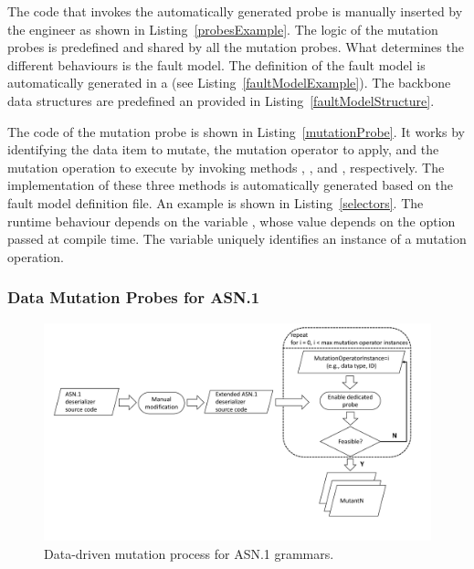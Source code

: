 \clearpage


The code that invokes the automatically generated probe is manually inserted by the engineer as shown in Listing~\ref{probesExample}.
The logic of the mutation probes is predefined and shared by all the mutation probes. What determines the different behaviours is the fault model.
The definition of the fault model is automatically generated in a  (see Listing~\ref{faultModelExample}). 
The backbone data structures are predefined an provided in Listing~\ref{faultModelStructure}.

The code of the mutation probe is shown in Listing~\ref{mutationProbe}. It works by identifying the data item to mutate, the mutation operator to apply, and the mutation operation to execute by invoking methods ,
, and , respectively. The implementation of these three methods is automatically generated based on the fault model definition file.
An example is shown in Listing~\ref{selectors}. The runtime behaviour depends on the variable , whose value depends on the option passed at compile time. 
The variable  uniquely identifies an instance of a mutation operation.












\subsubsection{Data Mutation Probes for ASN.1}
\label{sec:FAQASDataMutationProbesASN}


\begin{figure}[tb]
  \centering
    \includegraphics[width=\textwidth]{images/DataDrivenASNProcess}
      \caption{Data-driven mutation process for ASN.1 grammars.}
      \label{fig:DataDrivenASNProcess}
\end{figure}

